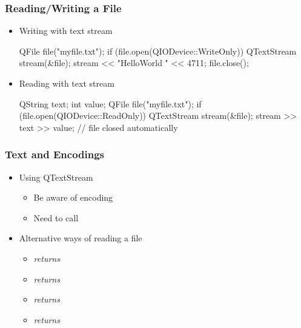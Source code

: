 
\begin{slide}[fragile]\frametitle{Reading/Writing a File}
  \begin{itemize}
    \item Writing with text stream
    \begin{cpp}
QFile file("myfile.txt");
if (file.open(QIODevice::WriteOnly)) {
  QTextStream stream(&file);
  stream << "HelloWorld " << 4711;
  file.close();
}
    \end{cpp}
    \item Reading with text stream
    \begin{cpp}
{
  QString text; int value;
  QFile file("myfile.txt");
  if (file.open(QIODevice::ReadOnly)) {
    QTextStream stream(&file);
    stream >> text >> value;
  }
} // file closed automatically
    \end{cpp}  
  \end{itemize}
\end{slide}


\begin{slide}\frametitle{Text and Encodings}
  \begin{itemize}
  \item Using QTextStream
    \begin{itemize}
    \item Be aware of encoding
    \item Need to call 
    \end{itemize}
  \item Alternative ways of reading a file
    \begin{itemize}
    \item {} \textit{returns }
    \item {} \textit{returns }
     \item {} \textit{returns }
    \item {} \textit{returns }   
    \end{itemize}
  \end{itemize}
\end{slide}


